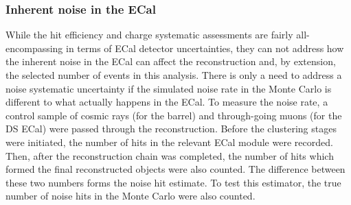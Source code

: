 \subsubsection{Inherent noise in the ECal}
While the hit efficiency and charge systematic assessments are fairly all-encompassing in terms of ECal detector uncertainties, they can not address how the inherent noise in the ECal can affect the reconstruction and, by extension, the selected number of events in this analysis.  There is only a need to address a noise systematic uncertainty if the simulated noise rate in the Monte Carlo is different to what actually happens in the ECal.  
\newline
\newline
To measure the noise rate, a control sample  of cosmic rays (for the barrel) and through-going muons (for the DS ECal) were passed through the reconstruction.  Before the clustering stages were initiated, the number of hits in the relevant ECal module were recorded.  Then, after the reconstruction chain was completed, the number of hits which formed the final reconstructed objects were also counted.  The difference between these two numbers forms the noise hit estimate.  To test this estimator, the true number of noise hits in the Monte Carlo were also counted.

